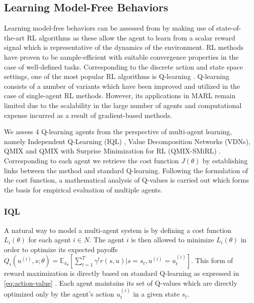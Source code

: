 \documentclass{article}
\begin{document}
\begin{multicols}{2}
\subsection{Learning Model-Free Behaviors}
Learning model-free behaviors can be assessed from by making use of state-of-the-art RL algorithms as these allow the agent to learn from a scalar reward signal which is representative of the dynamics of the environment. RL methods have proven to be sample-efficient \cite{atari} with suitable convergence properties \cite{rl} in the case of well-defined tasks. Corresponding to the discrete action and state space settings, one of the most popular RL algorithms is Q-learning \cite{rl}. Q-learning consists of a number of variants which have been improved and utilized in the case of single-agent RL methods. However, its applications in MARL remain limited due to the scalability in the large number of agents \cite{qmix} and computational expense incurred as a result of gradient-based methods. 

We assess 4 Q-learning agents from the perspective of multi-agent learning, namely Independent Q-Learning (IQL) \cite{iql}, Value Decomposition Networks (VDNs), QMIX \cite{qmix} and QMIX with Surprise Minimization for RL (QMIX-SMiRL) \cite{smirl}. Corresponding to each agent we retrieve the cost function $J(\theta)$ by establishing links between the method and standard Q-learning. Following the formulation of the cost function, a mathematical analysis of Q-values is carried out which forms the basis for empirical evaluation of multiple agents. 

\subsubsection{IQL}
A natural way to model a multi-agent system is by defining a cost function $L_{i}(\theta)$ for each agent $i \in N$. The agent $i$ is then allowed to minimize $L_{i}(\theta)$ in order to optimize its expected payoffs $Q_{i}(u^{(i)},s;\theta) = \mathbb{E}_{\pi_{\theta}}[\sum_{t=1}^{T}\gamma^{t}r(s,u)|s=s_{t},u^{(i)}=u^{(i)}_{t}]$. This form of reward maximization is directly based on standard Q-learning as expressed in \autoref{eq:action-value} \cite{iql}. Each agent maintains its set of Q-values which are directly optimized only by the agent's action $u^{(i)}_{t}$ in a given state $s_{t}$. 


\end{multicols}
\end{document}
